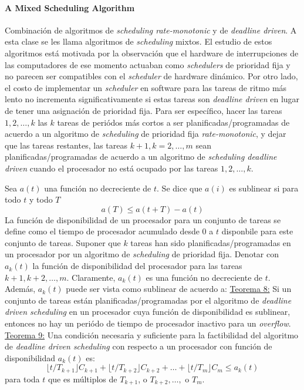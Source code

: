 \paragraph{\textnormal{\textbf{A Mixed Scheduling Algorithm}}}
Combinación de algoritmos de \emph{scheduling rate-monotonic} y de \emph{deadline driven}. A esta clase se les llama algoritmos de \emph{scheduling} mixtos. El estudio de estos algoritmos está motivada por la observación que el hardware de interrupciones de las computadores de ese momento actuaban como \emph{schedulers} de prioridad fija y no parecen ser compatibles con el \emph{scheduler} de hardware dinámico. Por otro lado, el costo de implementar un \emph{scheduler} en software para las tareas de ritmo más lento no incrementa significativamente si estas tareas son \emph{deadline driven} en lugar de tener una asignación de prioridad fija. Para ser específico, hacer las tareas $1, 2, \dots, k$ las $k$ tareas de periódos más cortos a ser planificadas/programadas de acuerdo a un algoritmo de \emph{scheduling} de prioridad fija \emph{rate-monotonic}, y dejar que las tareas restantes, las tareas $k + 1, k = 2, \dots, m$ sean planificadas/programadas de acuerdo a un algoritmo de \emph{scheduling deadline driven} cuando el procesador no está ocupado por las tareas $1, 2, \dots, k$.

Sea $a(t)$ una función no decreciente de $t$. Se dice que $a(i)$ es sublinear si para todo $t$ y todo $T$ $$a(T) \leq a(t + T) - a(t)$$ 
La función de disponibilidad de un procesador para un conjunto de tareas se define como el tiempo de procesador acumulado desde 0 a $t$ disponbile para este conjunto de tareas. Suponer que $k$ tareas han sido planificadas/programadas en un procesador por un algoritmo de \emph{scheduling} de prioridad fija. Denotar con $a_k(t)$ la función de disponibilidad del procesador para las tareas $k + 1, k + 2, \dots, m$. Claramente, $a_k(t)$ es una función no decreciente de $t$. Además, $a_k(t)$ puede ser vista como sublinear de acuerdo a: \underline{Teorema 8:} Si un conjunto de tareas están planificadas/programadas por el algoritmo de \emph{deadline driven scheduling} en un procesador cuya función de disponibilidad es sublinear, entonces no hay un periódo de tiempo de procesador inactivo para un \emph{overflow}. \underline{Teorema 9:} Una condición necesaria y suficiente para la factibilidad del algoritmo de \emph{deadline driven scheduling} con respecto a un procesador con función de disponibilidad $a_k(t)$ es: $$\lfloor t/T_{k+1} \rfloor C_{k+1} + \lfloor t/T_{k+2} \rfloor C_{k+2} + \dots + \lfloor t/T_m \rfloor C_m \leq a_k(t)$$ para toda $t$ que es múltiplos de $T_{k+1}$, o $T_{k+2}, \dots, $ o $T_m$.

